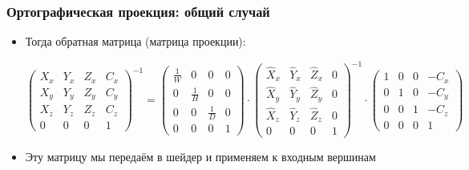 \documentclass{beamer}
\begin{document}
\begin{frame}[fragile]
\frametitle{Ортографическая проекция: общий случай}
\begin{itemize}
\item Тогда обратная матрица (матрица проекции):
\begin{center}
\begin{math}
\begin{pmatrix}
X_x & Y_x & Z_x & C_x \\
X_y & Y_y & Z_y & C_y \\
X_z & Y_z & Z_z & C_z \\
0 & 0 & 0 & 1
\end{pmatrix}^{-1}
=
\begin{pmatrix}
\frac{1}{W} & 0 & 0 & 0 \\
0 & \frac{1}{H} & 0 & 0 \\
0 & 0 & \frac{1}{D} & 0 \\
0 & 0 & 0 & 1
\end{pmatrix}
\cdot
\begin{pmatrix}
\hat X_x & \hat Y_x & \hat Z_x & 0 \\
\hat X_y & \hat Y_y & \hat Z_y & 0 \\
\hat X_z & \hat Y_z & \hat Z_z & 0 \\
0 & 0 & 0 & 1
\end{pmatrix}^{-1}
\cdot
\begin{pmatrix}
1 & 0 & 0 & -C_x \\
0 & 1 & 0 & -C_y \\
0 & 0 & 1 & -C_z \\
0 & 0 & 0 & 1
\end{pmatrix}
\end{math}
\end{center}
\pause
\item Эту матрицу мы передаём в шейдер и применяем к входным вершинам
\end{itemize}
\end{frame}
\end{document}
